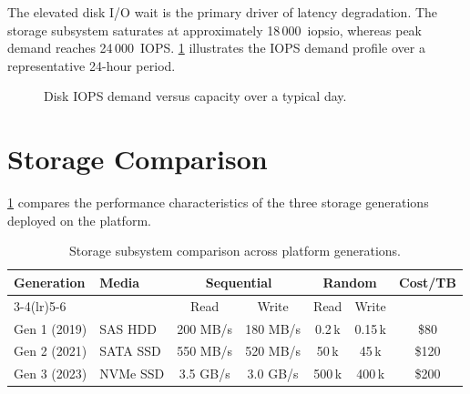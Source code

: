 \documentclass[
    language=english,
    doctype=technical-report,
    institution=none,
    titlestyle=book,
    oneside,
    loadGlossaries,
]{../../omnilatex}
\begin{document}
The elevated disk I/O wait is the primary driver of latency degradation.
The storage subsystem saturates at approximately 18\,000~\gls{iopsio},
whereas peak demand reaches 24\,000~IOPS. \cref{fig:iops} illustrates
the IOPS demand profile over a representative 24-hour period.

\begin{figure}[htbp]
    \centering
    \caption{Disk IOPS demand versus capacity over a typical day.}
    \label{fig:iops}
\end{figure}

\section{Storage Comparison}

\cref{tab:storage-comparison} compares the performance characteristics
of the three storage generations deployed on the platform.

\begin{table}[htbp]
    \centering
    \caption{Storage subsystem comparison across platform generations.}
    \label{tab:storage-comparison}
    \begin{tabular}{@{}llccccc@{}}
        \toprule
        \multirow{2}{*}{Generation} & \multirow{2}{*}{Media} & \multicolumn{2}{c}{Sequential} & \multicolumn{2}{c}{Random} & \multirow{2}{*}{Cost/TB} \\
        \cmidrule(lr){3-4}\cmidrule(lr){5-6}
         & & Read & Write & Read & Write & \\
        \midrule
        Gen 1 (2019) & SAS HDD  & 200 MB/s & 180 MB/s & 0.2\,k & 0.15\,k & \$80 \\
        Gen 2 (2021) & SATA SSD & 550 MB/s & 520 MB/s & 50\,k   & 45\,k   & \$120 \\
        Gen 3 (2023) & NVMe SSD & 3.5 GB/s & 3.0 GB/s & 500\,k  & 400\,k  & \$200 \\
        \bottomrule
    \end{tabular}
\end{table}
\end{document}
